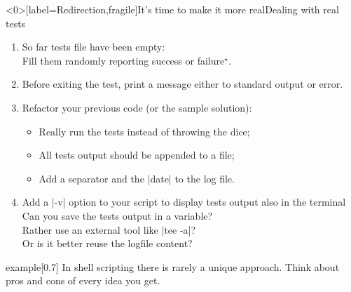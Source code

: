 \begin{frame}<0>[label=Redirection,fragile]{It's time to make it more real}{Dealing with real tests}
    \vspace{-2mm}
    \begin{enumerate}
        \item So far tests file have been empty:\\
              \then Fill them randomly reporting success or failure$^\star$.
        \item Before exiting the test, print a message either to standard output or error.
        \item Refactor your previous code (or the sample solution):
              \begin{itemize}
                  \item Really run the tests instead of throwing the dice;
                  \item All tests output should be appended to a  file;
                  \item Add a separator and the \bash|date| to the log file.
              \end{itemize}
        \item Add a \bash|-v| option to your script to display tests output also in the terminal\\
              \then Can you save the tests output in a variable?\\
              \then Rather use an external tool like \bash|tee -a|? \\
              \then Or is it better reuse the logfile content? 
    \end{enumerate}
    \begin{varblock}{example}[0.7\textwidth]{}
        In shell scripting there is rarely a unique approach.
        Think about pros and cons of every idea you get.
    \end{varblock}
\end{frame}
